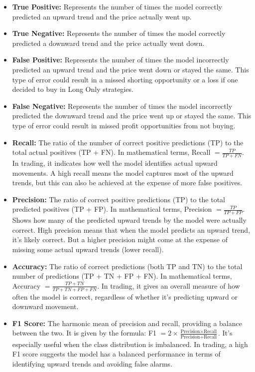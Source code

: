 \begin{itemize}
	\item \textbf{True Positive:} Represents the number of times the model correctly predicted an upward trend and the price actually went up.

	\item \textbf{True Negative:} Represents the number of times the model correctly predicted a downward trend and the price actually went down.

	\item \textbf{False Positive:} Represents the number of times the model incorrectly predicted an upward trend and the price went down or stayed the same. This type of error could result in a missed shorting opportunity or a loss if one decided to buy in Long Only strategies.

	\item \textbf{False Negative:} Represents the number of times the model incorrectly predicted the downward trend and the price went up or stayed the same. This type of error could result in missed profit opportunities from not buying.

	\item \textbf{Recall:} The ratio of the number of correct positive predictions (TP) to the total actual positives (TP + FN). In mathematical terms, Recall $= \frac{TP}{TP + FN}$. In trading, it indicates how well the model identifies actual upward movements. A high recall means the model captures most of the upward trends, but this can also be achieved at the expense of more false positives.

	\item \textbf{Precision:} The ratio of correct positive predictions (TP) to the total predicted positives (TP + FP). In mathematical terms, Precision $= \frac{TP}{TP + FP}$. Shows how many of the predicted upward trends by the model were actually correct. High precision means that when the model predicts an upward trend, it's likely correct. But a higher precision might come at the expense of missing some actual upward trends (lower recall).

	\item \textbf{Accuracy:} The ratio of correct predictions (both TP and TN) to the total number of predictions (TP + TN + FP + FN). In mathematical terms, Accuracy $= \frac{TP + TN}{TP + TN + FP + FN}$. In trading, it gives an overall measure of how often the model is correct, regardless of whether it's predicting upward or downward movement.

	\item \textbf{F1 Score:} The harmonic mean of precision and recall, providing a balance between the two. It is given by the formula: F1 $= 2 \times \frac{\text{Precision} \times \text{Recall}}{\text{Precision} + \text{Recall}}$. It's especially useful when the class distribution is imbalanced. In trading, a high F1 score suggests the model has a balanced performance in terms of identifying upward trends and avoiding false alarms.
\end{itemize}


